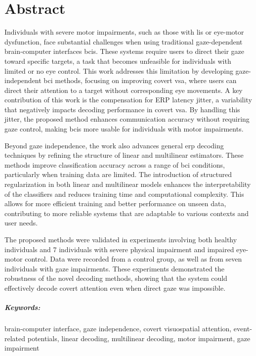 \chapter*{Abstract}

Individuals with severe motor impairments, such as those with \ac{lis}
or eye-motor dysfunction, face substantial challenges when using traditional
gaze-dependent brain-computer interfaces \acp{bci}.
These systems require users to direct their gaze toward specific targets, a
task that becomes unfeasible for individuals with limited or no eye control.
This work addresses this limitation by developing gaze-independent
\ac{bci} methods, focusing on improving covert \ac{vsa}, where users can direct
their attention to a target without corresponding eye movements.
A key contribution of this work is the compensation for ERP latency jitter, a
variability that negatively impacts decoding performance in covert \ac{vsa}.
By handling this jitter, the proposed method enhances communication accuracy
without requiring gaze control, making \acp{bci} more usable for individuals with
motor impairments.

Beyond gaze independence, the work also advances general \ac{erp} decoding
techniques by refining the structure of linear and multilinear estimators.
These methods improve classification accuracy across a range of \ac{bci}
conditions, particularly when training data are limited.
The introduction of structured regularization in both linear and multilinear
models enhances the interpretability of the classifiers and reduces training
time and computational complexity.
This allows for more efficient training and better performance on unseen data,
contributing to more reliable systems that are adaptable to various contexts and user needs.

The proposed methods were validated in experiments involving both healthy
individuals and 7 individuals with severe physical impairment and impaired eye-motor control.
Data were recorded from a control group, as well as from seven individuals with
gaze impairments.
These experiments demonstrated the robustness of the novel decoding methods,
showing that the system could effectively decode covert attention even when
direct gaze was impossible.

\paragraph{Keywords:} brain-computer interface, gaze independence, covert
visuospatial attention, event-related potentials, linear decoding, multilinear
decoding, motor impairment, gaze impairment
